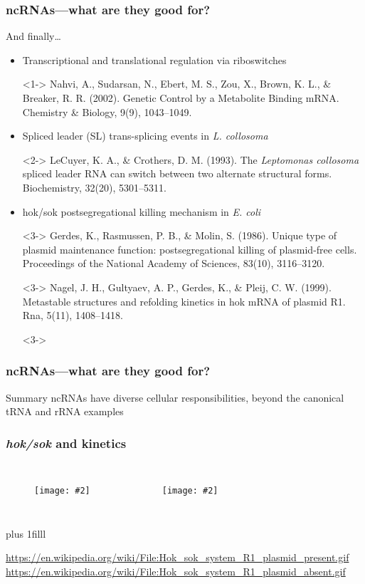 \documentclass{beamer}
\newcommand{\slidefigure}[2][1]{\texttt{[image: \#2]}}
\newcommand{\btVFill}{\vskip 0pt plus 1filll}
\begin{document}
\begin{frame}
	\frametitle{ncRNAs---what are they good for?}

	And finally\dots
	\begin{itemize}
		\item<1-> Transcriptional and translational regulation via riboswitches
		\item[]<1-> \scriptsize Nahvi, A., Sudarsan, N., Ebert, M. S., Zou, X., Brown, K. L., \& Breaker, R. R. (2002). Genetic Control by a Metabolite Binding mRNA. Chemistry \& Biology, 9(9), 1043--1049.
		\item<2-> Spliced leader (SL) trans-splicing events in {\em L. collosoma}
		\item[]<2-> \scriptsize LeCuyer, K. A., \& Crothers, D. M. (1993). The {\em Leptomonas collosoma} spliced leader RNA can switch between two alternate structural forms. Biochemistry, 32(20), 5301--5311.
		\item<3-> hok/sok postsegregational killing mechanism in {\em E. coli}
		\item[]<3-> \scriptsize Gerdes, K., Rasmussen, P. B., \& Molin, S. (1986). Unique type of plasmid maintenance function: postsegregational killing of plasmid-free cells. Proceedings of the National Academy of Sciences, 83(10), 3116--3120.
		\item[]<3-> \scriptsize Nagel, J. H., Gultyaev, A. P., Gerdes, K., \& Pleij, C. W. (1999). Metastable structures and refolding kinetics in hok mRNA of plasmid R1. Rna, 5(11), 1408--1418.
		\item[]<3->
	\end{itemize}
\end{frame}

\begin{frame}
	\frametitle{ncRNAs---what are they good for?}
	\begin{block}
		{Summary} ncRNAs have diverse cellular responsibilities, beyond the canonical tRNA and rRNA examples
	\end{block}
\end{frame}


\begin{frame}
	\frametitle{{\em hok/sok} and kinetics}
	\begin{columns}
		\begin{figure}
			\centering \slidefigure{r1present}
		\end{figure}

		\begin{figure}
			\centering \slidefigure{r1missing}
		\end{figure}
	\end{columns}

	\btVFill
	\begin{center}
		\tiny \color{litegray} \url{https://en.wikipedia.org/wiki/File:Hok_sok_system_R1_plasmid_present.gif} \\
		\url{https://en.wikipedia.org/wiki/File:Hok_sok_system_R1_plasmid_absent.gif}
	\end{center}
\end{frame}
\end{document}
